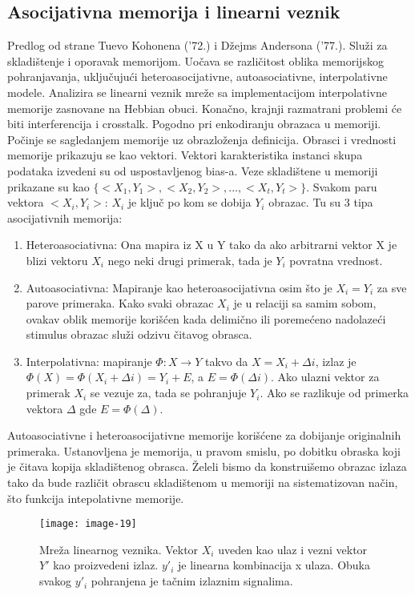 \documentclass[fontsize=11bp, paper=a4]{scrarticle}
\begin{document}
\subsection{Asocijativna memorija i linearni veznik}
Predlog od strane Tuevo Kohonena ('72.) i Džejms Andersona ('77.). Služi za skladištenje i oporavak memorijom. Uočava se različitost oblika memorijskog pohranjavanja, uključujući heteroasocijativne, autoasociativne, interpolativne modele. Analizira se linearni veznik mreže sa implementacijom interpolativne memorije zasnovane na Hebbian obuci. Konačno, krajnji razmatrani problemi će biti interferencija i crosstalk. Pogodno pri enkodiranju obrazaca u memoriji. Počinje se sagledanjem memorije uz obrazloženja definicija. Obrasci i vrednosti memorije prikazuju se kao vektori. Vektori karakteristika instanci skupa podataka izvedeni su od uspostavljenog bias-a. Veze skladištene u memoriji prikazane su kao $\{<X_1, Y_1>, <X_2, Y_2>, ..., <X_t, Y_t>\}$. Svakom paru vektora $<X_i, Y_i>$: $X_i$ je ključ po kom se dobija $Y_i$ obrazac. Tu su 3 tipa asocijativnih memorija:
\begin{enumerate}
    \item Heteroasociativna: Ona mapira iz X u Y tako da ako arbitrarni vektor X je blizi vektoru $X_i$ nego neki drugi primerak, tada je $Y_i$ povratna vrednost.
    \item Autoasociativna: Mapiranje kao heteroasocijativna osim što je $X_i = Y_i$ za sve parove primeraka. Kako svaki obrazac $X_i$ je u relaciji sa samim sobom, ovakav oblik memorije korišćen kada delimično ili poremećeno nadolazeći stimulus obrazac služi odzivu čitavog obrasca.
    \item Interpolativna: mapiranje $\Phi : X \rightarrow Y$ takvo da $X=X_i + \Delta i$, izlaz je $\Phi(X) = \Phi(X_i + \Delta i) = Y_i + E$, a $E=\Phi(\Delta i)$. Ako ulazni vektor za primerak $X_i$ se vezuje za, tada se pohranjuje $Y_i$. Ako se razlikuje od primerka vektora $\Delta$ gde $E=\Phi(\Delta)$. 
\end{enumerate}

Autoasociativne i heteroasocijativne memorije korišćene za dobijanje originalnih primeraka. Ustanovljena je memorija, u pravom smislu, po dobitku obraska koji je čitava kopija skladištenog obrasca. Želeli bismo da konstruišemo obrazac izlaza tako da bude različit obrascu skladištenom u memoriji na sistematizovan način, što funkcija intepolativne memorije.
\begin{figure}[h!]
    \centering
    \texttt{[image: image-19]}
    \caption{Mreža linearnog veznika. Vektor $X_i$ uveden kao ulaz i vezni vektor $Y'$ kao proizvedeni izlaz. $y'_i$ je linearna kombinacija x ulaza. Obuka svakog $y'_i$ pohranjena je tačnim izlaznim signalima.}
\end{figure}
\end{document}
